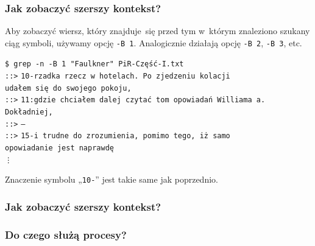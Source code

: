 \documentclass[10pt,t]{beamer}
\begin{document}
\begin{frame}
  \frametitle{Jak zobaczyć szerszy kontekst?}


  Aby zobaczyć wiersz, który znajduje~się przed tym w~którym znaleziono
  szukany ciąg symboli, używamy opcję \texttt{-B 1}. Analogicznie działają
  opcję \texttt{-B 2}, \texttt{-B 3}, etc.

  \texttt{\$ grep -n -B 1 "Faulkner"{} PiR-Część-I.txt} \\
  \texttt{::>} \texttt{10-rzadka rzecz w hotelach. Po zjedzeniu kolacji} \\
  \texttt{udałem~się do swojego pokoju,} \\
  \texttt{::>} \texttt{11:gdzie chciałem dalej czytać tom opowiadań
    Williama a. Dokładniej,} \\
  \texttt{::>} \texttt{--} \\
  \texttt{::>} \texttt{15-i trudne do zrozumienia, pomimo tego, iż samo} \\
  \texttt{opowiadanie jest naprawdę} \\
  \hspace{2em} \texttt{\vdots}

  Znaczenie symbolu „\texttt{10-}” jest takie same jak poprzednio.

\end{frame}





\begin{frame}
  \frametitle{Jak zobaczyć szerszy kontekst?}




\end{frame}



\begin{frame}
  \frametitle{Do czego służą procesy?}




\end{frame}
\end{document}

